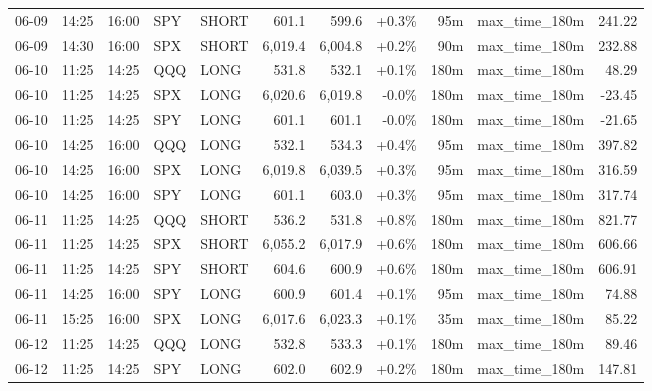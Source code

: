 \documentclass[11pt,a4paper,twoside]{article}
\begin{document}
\begin{center}
\begin{longtable}{>{\color{txtmain}}l l l l l r r r r >{\color{txtmain}}l r}
06-09 & 14:25 & 16:00 & SPY & SHORT & 601.1 & 599.6 & \textcolor{wingreen}{+0.3\%} & 95m & max\_time\_180m & \textcolor{wingreen}{241.22} \\
06-09 & 14:30 & 16:00 & SPX & SHORT & 6,019.4 & 6,004.8 & \textcolor{wingreen}{+0.2\%} & 90m & max\_time\_180m & \textcolor{wingreen}{232.88} \\
06-10 & 11:25 & 14:25 & QQQ & LONG & 531.8 & 532.1 & \textcolor{wingreen}{+0.1\%} & 180m & max\_time\_180m & \textcolor{wingreen}{48.29} \\
06-10 & 11:25 & 14:25 & SPX & LONG & 6,020.6 & 6,019.8 & \textcolor{lossred}{-0.0\%} & 180m & max\_time\_180m & \textcolor{lossred}{-23.45} \\
06-10 & 11:25 & 14:25 & SPY & LONG & 601.1 & 601.1 & \textcolor{lossred}{-0.0\%} & 180m & max\_time\_180m & \textcolor{lossred}{-21.65} \\
06-10 & 14:25 & 16:00 & QQQ & LONG & 532.1 & 534.3 & \textcolor{wingreen}{+0.4\%} & 95m & max\_time\_180m & \textcolor{wingreen}{397.82} \\
06-10 & 14:25 & 16:00 & SPX & LONG & 6,019.8 & 6,039.5 & \textcolor{wingreen}{+0.3\%} & 95m & max\_time\_180m & \textcolor{wingreen}{316.59} \\
06-10 & 14:25 & 16:00 & SPY & LONG & 601.1 & 603.0 & \textcolor{wingreen}{+0.3\%} & 95m & max\_time\_180m & \textcolor{wingreen}{317.74} \\
06-11 & 11:25 & 14:25 & QQQ & SHORT & 536.2 & 531.8 & \textcolor{wingreen}{+0.8\%} & 180m & max\_time\_180m & \textcolor{wingreen}{821.77} \\
06-11 & 11:25 & 14:25 & SPX & SHORT & 6,055.2 & 6,017.9 & \textcolor{wingreen}{+0.6\%} & 180m & max\_time\_180m & \textcolor{wingreen}{606.66} \\
06-11 & 11:25 & 14:25 & SPY & SHORT & 604.6 & 600.9 & \textcolor{wingreen}{+0.6\%} & 180m & max\_time\_180m & \textcolor{wingreen}{606.91} \\
06-11 & 14:25 & 16:00 & SPY & LONG & 600.9 & 601.4 & \textcolor{wingreen}{+0.1\%} & 95m & max\_time\_180m & \textcolor{wingreen}{74.88} \\
06-11 & 15:25 & 16:00 & SPX & LONG & 6,017.6 & 6,023.3 & \textcolor{wingreen}{+0.1\%} & 35m & max\_time\_180m & \textcolor{wingreen}{85.22} \\
06-12 & 11:25 & 14:25 & QQQ & LONG & 532.8 & 533.3 & \textcolor{wingreen}{+0.1\%} & 180m & max\_time\_180m & \textcolor{wingreen}{89.46} \\
06-12 & 11:25 & 14:25 & SPY & LONG & 602.0 & 602.9 & \textcolor{wingreen}{+0.2\%} & 180m & max\_time\_180m & \textcolor{wingreen}{147.81} \\

\end{longtable}
\end{center}
\end{document}
